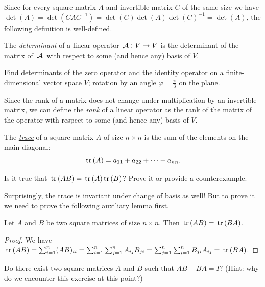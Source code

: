 Since for every square matrix $A$ and invertible matrix $C$ of the same size we have $\det(A) = \det(C A C^{-1}) = \det(C) \det(A) \det(C)^{-1} = \det(A)$, the following definition is well-defined.

\begin{definition}
The \underline{\it determinant} of a linear operator $\,\mathcal{A}\,\colon V \to V$ is the determinant of the matrix of $\,\mathcal{A}\,$ with respect to some (and hence any) basis of $V$.
\end{definition}

\begin{exercise}
Find determinants of the zero operator and the identity operator on a finite-dimensional vector space $V$; rotation by an angle $\varphi = \frac{\pi}{3}$ on the plane.
\end{exercise}

\begin{definition}
Since the rank of a matrix does not change under multiplication by an invertible matrix, we can define the \underline{\it rank} of a linear operator as the rank of the matrix of the operator with respect to some (and hence any) basis of $V$.
\end{definition}

\begin{definition}
The \underline{\it trace} of a square matrix $A$ of size $n\times n$ is the sum of the elements on the main diagonal: $$\,\mathrm{tr}\,(A) = a_{11} + a_{22} + \dots + a_{nn}.$$
\end{definition}

\begin{exercise}
Is it true that $\,\mathrm{tr}\,(A B) = \,\mathrm{tr}\,(A)\,\mathrm{tr}\,(B)$? Prove it or provide a counterexample.
\end{exercise}

Surprisingly, the trace is invariant under change of basis as well! But to prove it we need to prove the following auxiliary lemma first.

\begin{lemma}
Let $A$ and $B$ be two square matrices of size $n\times n$. Then $\,\mathrm{tr}\,(A B) = \,\mathrm{tr}\,(B A)$.
\end{lemma}

\begin{proof}
We have $\,\mathrm{tr}\,(A B) = \sum_{i=1}^n (A B)_{ii} = \sum_{i=1}^n \sum_{j=1}^n A_{ij} B_{ji} = \sum_{j=1}^n \sum_{i=1}^n B_{ji} A_{ij} = \,\mathrm{tr}\,(B A)$.
\end{proof}

\begin{exercise}
Do there exist two square matrices $A$ and $B$ such that $A B - BA = I$? (Hint: why do we encounter this exercise at this point?)
\end{exercise}

